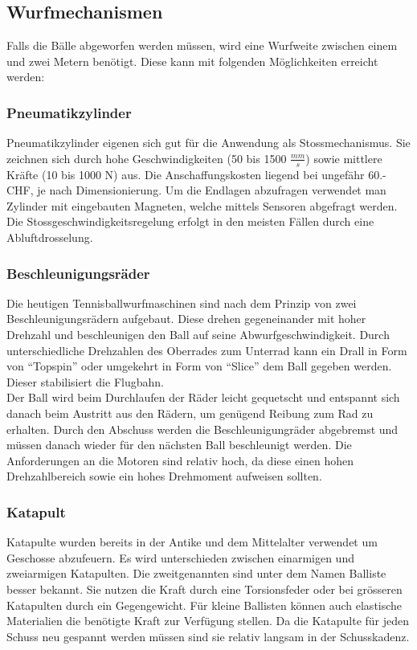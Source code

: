 \subsection{Wurfmechanismen}
Falls die Bälle abgeworfen werden müssen, wird eine Wurfweite zwischen einem und zwei Metern benötigt. Diese kann mit folgenden Möglichkeiten erreicht werden:

\subsubsection{Pneumatikzylinder}
Pneumatikzylinder eigenen sich gut für die Anwendung als Stossmechanismus. Sie zeichnen sich durch hohe Geschwindigkeiten (50 bis 1500 $\frac{mm}{s}$) sowie mittlere Kräfte (10 bis 1000 N) aus. Die Anschaffungskosten liegend bei ungefähr 60.- CHF, je nach Dimensionierung. Um die Endlagen abzufragen verwendet man Zylinder mit eingebauten Magneten, welche mittels Sensoren abgefragt werden. Die Stossgeschwindigkeitsregelung erfolgt in den meisten Fällen durch eine Abluftdrosselung.

\subsubsection{Beschleunigungsräder}
Die heutigen Tennisballwurfmaschinen sind nach dem Prinzip von zwei Beschleunigungsrädern aufgebaut. Diese drehen gegeneinander mit hoher Drehzahl und beschleunigen den Ball auf seine Abwurfgeschwindigkeit. Durch unterschiedliche Drehzahlen des Oberrades zum Unterrad kann ein Drall in Form von \enquote{Topspin} oder umgekehrt in Form von \enquote{Slice} dem Ball gegeben werden. Dieser stabilisiert die Flugbahn.\\
Der Ball wird beim Durchlaufen der Räder leicht gequetscht und entspannt sich danach beim Austritt aus den Rädern, um genügend Reibung zum Rad zu erhalten. Durch den Abschuss werden die Beschleunigungräder abgebremst und müssen danach wieder für den nächsten Ball beschleunigt werden. Die Anforderungen an die Motoren sind relativ hoch, da diese einen hohen Drehzahlbereich sowie ein hohes Drehmoment aufweisen sollten.

\subsubsection{Katapult}
Katapulte wurden bereits in der Antike und dem Mittelalter verwendet um Geschosse abzufeuern. Es wird unterschieden zwischen einarmigen und zweiarmigen Katapulten. Die zweitgenannten sind unter dem Namen Balliste besser bekannt. Sie nutzen die Kraft durch eine Torsionsfeder oder bei grösseren Katapulten durch ein Gegengewicht. Für kleine Ballisten können auch elastische Materialien die benötigte Kraft zur Verfügung stellen. Da die Katapulte für jeden Schuss neu gespannt werden müssen sind sie relativ langsam in der Schusskadenz. 


